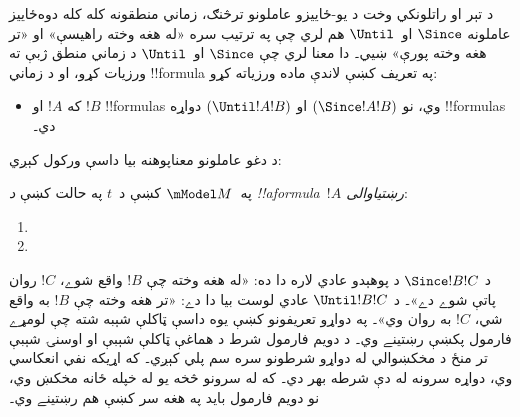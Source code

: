 \documentclass[../../../include/open-logic-section]{subfiles}
\begin{document}


د تېر او راتلونکي وخت د يو-ځاييزو عاملونو ترڅنګ، زماني منطقونه کله کله
دوه‌ځاييز عاملونه $\Since $ او~$\Until$ هم لري چې په ترتيب سره
«له هغه وخته راهيسې» او «تر هغه وخته پورې» ښيي۔ دا معنا لري چې
$\Since $ او~$\Until$ د زماني منطق ژبې ته ورزيات کړو، او د زماني
!!{formula} په تعريف کښې لاندې ماده ورزياته کړو:

\begin{itemize}
\item[] که $!A$ او $!B$ !!{formula}s وي، نو $(\Since  !A !B)$ او
  $(\Until !A !B)$ دواړه !!{formula}s دي۔
\end{itemize}

د دغو عاملونو معناپوهنه بيا داسې ورکول کېږي:

\begin{defn}
  په~$\mModel M$ کښې د~$t$ په حالت کښې \emph{د !!a{formula}~$!A$ رښتياوالی}:
  \begin{enumerate}
  \item{} 
   \item{} 
  \end{enumerate}
\end{defn}

د $\Since  !B !C$ د پوهېدو عادي لاره دا ده: «له هغه وخته چې
$!B$ واقع شوے، $!C$ روان پاتې شوے دے»۔ د $\Until !B !C$
عادي لوست بيا دا دے: «تر هغه وخته چې $!B$ به واقع شي، $!C$
به روان وي»۔ په دواړو تعريفونو کښې يوه داسې ټاکلې شېبه شته چې
لومړے فارمول پکښې رښتينے وي۔ د دويم فارمول شرط د هماغې
ټاکلې شېبې او اوسنۍ شېبې تر منځ د مخکښوالي له دواړو شرطونو
سره سم پلي کېږي۔ که اړيکه نفي انعکاسي وي، دواړه سرونه له
دې شرطه بهر دي۔ که له سرونو څخه يو له خپله ځانه مخکښ وي،
نو دويم فارمول بايد په هغه سر کښې هم رښتينے وي۔
\end{document}
